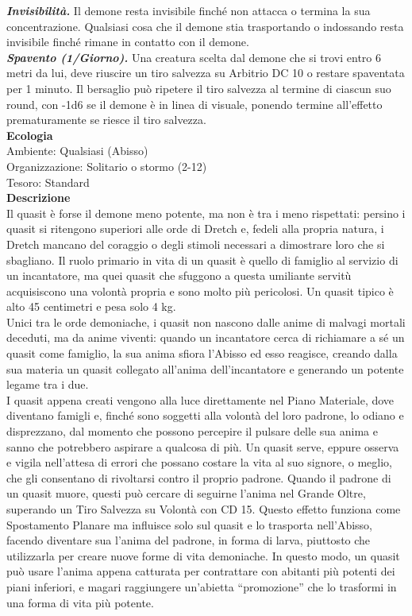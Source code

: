 \begin{multicols}{2}
\emph{\textbf{Invisibilità.}} Il demone resta invisibile finché non attacca o termina la sua concentrazione. Qualsiasi cosa che il demone stia trasportando o indossando resta invisibile finché rimane in contatto con il demone.\\
\emph{\textbf{Spavento (1/Giorno).}} Una creatura scelta dal demone che si trovi entro 6 metri da lui, deve riuscire un tiro salvezza su Arbitrio DC 10 o restare spaventata per 1 minuto. Il bersaglio può ripetere il tiro salvezza al termine di ciascun suo round, con -1d6 se il demone è in linea di visuale, ponendo termine all'effetto prematuramente se riesce il tiro salvezza.\\
\textbf{Ecologia}\\
Ambiente: Qualsiasi (Abisso)\\
Organizzazione: Solitario o stormo (2-12)\\
Tesoro: Standard\\
\textbf{Descrizione}\\
Il quasit è forse il demone meno potente, ma non è tra i meno rispettati: persino i quasit si ritengono superiori alle orde di Dretch e, fedeli alla propria natura, i Dretch mancano del coraggio o degli stimoli necessari a dimostrare loro che si sbagliano. Il ruolo primario in vita di un quasit è quello di famiglio al servizio di un incantatore, ma quei quasit che sfuggono a questa umiliante servitù acquisiscono una volontà propria e sono molto più pericolosi. Un quasit tipico è alto 45 centimetri e pesa solo 4 kg.\\
Unici tra le orde demoniache, i quasit non nascono dalle anime di malvagi mortali deceduti, ma da anime viventi: quando un incantatore cerca di richiamare a sé un quasit come famiglio, la sua anima sfiora l'Abisso ed esso reagisce, creando dalla sua materia un quasit collegato all'anima dell’incantatore e generando un potente legame tra i due.\\
I quasit appena creati vengono alla luce direttamente nel Piano Materiale, dove diventano famigli e, finché sono soggetti alla volontà del loro padrone, lo odiano e disprezzano, dal momento che possono percepire il pulsare delle sua anima e sanno che potrebbero aspirare a qualcosa di più. Un quasit serve, eppure osserva e vigila nell'attesa di errori che possano costare la vita al suo signore, o meglio, che gli consentano di rivoltarsi contro il proprio padrone. Quando il padrone di un quasit muore, questi può cercare di seguirne l'anima nel Grande Oltre, superando un Tiro Salvezza su Volontà con CD 15. Questo effetto funziona come Spostamento Planare ma influisce solo sul quasit e lo trasporta nell'Abisso, facendo diventare sua l'anima del padrone, in forma di larva, piuttosto che utilizzarla per creare nuove forme di vita demoniache. In questo modo, un quasit può usare l'anima appena catturata per contrattare con abitanti più potenti dei piani inferiori, e magari raggiungere un'abietta “promozione” che lo trasformi in una forma di vita più potente.\\

\end{multicols}
